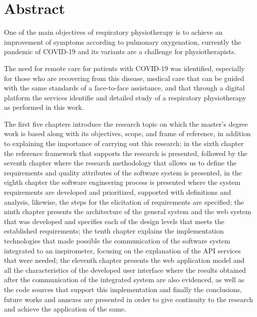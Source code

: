 \documentclass[12pt]{article}
\begin{document}
\newpage

\section*{Abstract}

One of the main objectives of respiratory physiotherapy is to achieve an improvement of symptoms according to pulmonary oxygenation, currently the pandemic of COVID-19 and its variants are a challenge for physiotherapists. 


The need for remote care for patients with COVID-19 was identified, especially for those who are recovering from this disease, medical care that can be guided with the same standards of a face-to-face assistance, and that through a digital platform the services identifie and detailed study of a respiratory physiotherapy as performed in this work. 

The first five chapters introduce the research topic on which the master's degree work is based along with its objectives, scope, and frame of reference, in addition to explaining the importance of carrying out this research; in the sixth chapter the reference framework that supports the research is presented, followed by the seventh chapter where the research methodology that allows us to define the requirements and quality attributes of the software system is presented, in the eighth chapter the software engineering process is presented where the system requirements are developed and prioritized, supported with definitions and analysis, likewise, the steps for the elicitation of requirements are specified; the ninth chapter presents the architecture of the general system and the web system that was developed and specifies each of the design levels that meets the established requirements; the tenth chapter explains the implementation technologies that made possible the communication of the software system integrated to an inspirometer, focusing on the explanation of the API services that were needed; the eleventh chapter presents the web application model and all the characteristics of the developed user interface where the results obtained after the communication of the integrated system are also evidenced, as well as the code sources that support this implementation and finally the conclusions, future works and annexes are presented in order to give continuity to the research and achieve the application of the same.  
\end{document}
